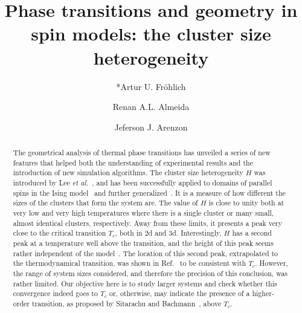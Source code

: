 \documentclass[aps,superscriptaddress]{revtex4}
\begin{document}
\title{Phase transitions and geometry in spin models: the cluster size heterogeneity}

\author{*Artur U. Fröhlich}
\author{Renan A.L. Almeida}
\author{Jeferson J. Arenzon}



\baselineskip
\begin{abstract}
\large
The geometrical analysis of thermal phase transitions has unveiled a series of new features that helped both the understanding of experimental results and the introduction of new simulation algorithms.
The cluster size heterogeneity $H$ was introduced by Lee \textit{et al.}~\cite{LeKiPa11}, and has been successfully  applied to domains of parallel spins in the Ising model~\cite{JoYiBaKi12,RoOlAr15,AzAlOlAr22} and further generalized~\cite{MaAzArCo21}. It is a measure of how different the sizes of the clusters that form the system are. 
The value of $H$ is close to unity both at very low and very high temperatures where there is a single cluster or many small, almost identical clusters, respectively.
Away from these limits, it presents a peak very close to the critical transition $T_c$, both in 2d and 3d.
Interestingly, $H$ has a second peak at a temperature well above the transition, and the height of this peak seems rather independent of the model~\cite{AzAlOlAr22}.  
The location of this second peak, extrapolated to the thermodynamical transition, was shown in Ref.~\cite{RoOlAr15} to be consistent with $T_c$.
However, the range of system sizes considered, and therefore the precision of this conclusion, was rather limited.
Our objective here is to study larger systems and check whether this convergence indeed goes to $T_c$ or, otherwise, may indicate the presence of a higher-order transition, as proposed by Sitarachu and Bachmann~\cite{SiBa22}, above $T_c$.

\end{abstract}
\maketitle


   

\end{document}
